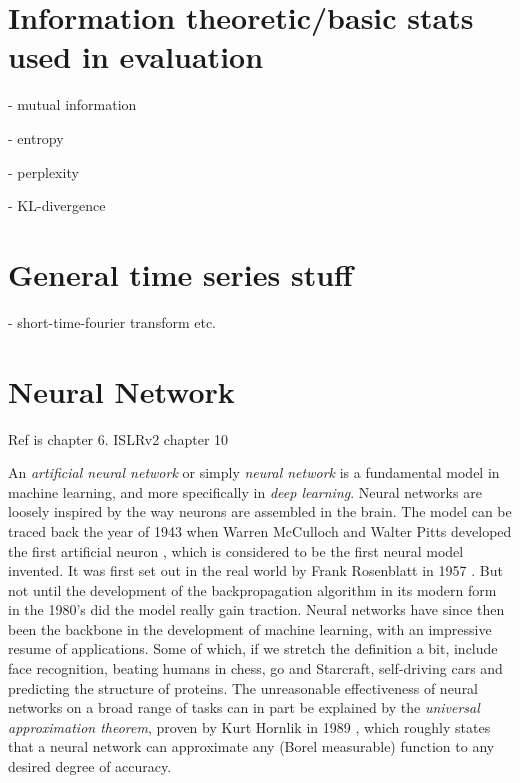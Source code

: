 \documentclass[../../thesis.tex]{subfiles}
\begin{document}


\section{Information theoretic/basic stats used in evaluation}

- mutual information

- entropy

- perplexity

- KL-divergence

\section{General time series stuff}
- short-time-fourier transform etc.

\section{Neural Network}


Ref is \cite{deeplearningbook} chapter 6. ISLRv2 chapter 10

An \textit{artificial neural network} or simply \textit{neural network} is a fundamental model in machine learning, and more specifically in \textit{deep learning}. Neural networks are loosely inspired by the way neurons are assembled in the brain. The model can be traced back the year of 1943 when Warren McCulloch and Walter Pitts developed the first artificial neuron \cite{MCCULLOCH199099}, which is considered to be the first neural model invented. It was first set out in the real world by Frank Rosenblatt in 1957 \cite{rosenblatt1957perceptron}. But not until the development of the backpropagation algorithm in its modern form in the 1980's did the model really gain traction. Neural networks have since then been the backbone in the development of machine learning, with an impressive resume of applications. Some of which, if we stretch the definition a bit, include face recognition, beating humans in chess, go and Starcraft, self-driving cars and predicting the structure of proteins. The unreasonable effectiveness of neural networks on a broad range of tasks can in part be explained by the \textit{universal approximation theorem}, proven by Kurt Hornlik in 1989 \cite{HORNIK1989359}, which roughly states that a neural network can approximate any (Borel measurable) function to any desired degree of accuracy. 
\end{document}

